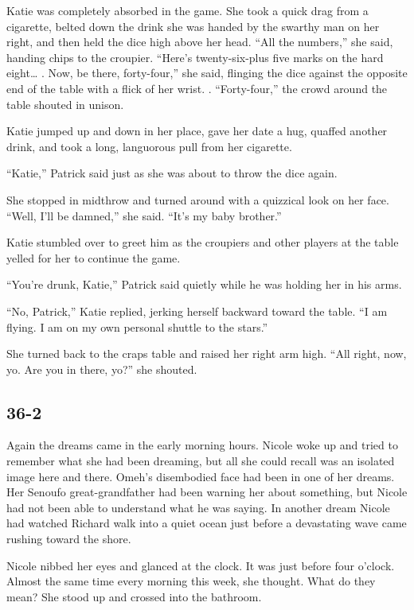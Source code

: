 \documentclass[]{article}
\begin{document}
{Katie was completely absorbed in the game. She took a quick drag from a cigarette, belted down the drink she was handed by the swarthy man on her right, and then held the dice high above her head. “All the numbers,” she said, handing chips to the croupier. “Here’s twenty-six-plus five marks on the hard eight… . Now, be there, forty-four,” she said, flinging the dice against the opposite end of the table with a flick of her wrist. . “Forty-four,” the crowd around the table shouted in unison.

Katie jumped up and down in her place, gave her date a hug, quaffed another drink, and took a long, languorous pull from her cigarette.

“Katie,” Patrick said just as she was about to throw the dice again.

She stopped in midthrow and turned around with a quizzical look on her face. “Well, I’ll be damned,” she said. “It’s my baby brother.”

Katie stumbled over to greet him as the croupiers and other players at the table yelled for her to continue the game.

“You’re drunk, Katie,” Patrick said quietly while he was holding her in his arms.

“No, Patrick,” Katie replied, jerking herself backward toward the table. “I am flying. I am on my own personal shuttle to the stars.”

She turned back to the craps table and raised her right arm high. “All right, now, yo. Are you in there, yo?” she shouted.


\subsection{36-2}

Again the dreams came in the early morning hours. Nicole woke up and tried to remember what she had been dreaming, but all she could recall was an isolated image here and there. Omeh’s disembodied face had been in one of her dreams. Her Senoufo great-grandfather had been warning her about something, but Nicole had not been able to understand what he was saying. In another dream Nicole had watched Richard walk into a quiet ocean just before a devastating wave came rushing toward the shore.

Nicole nibbed her eyes and glanced at the clock. It was just before four o’clock. Almost the same time every morning this week, she thought. What do they mean? She stood up and crossed into the bathroom.

}
\end{document}
